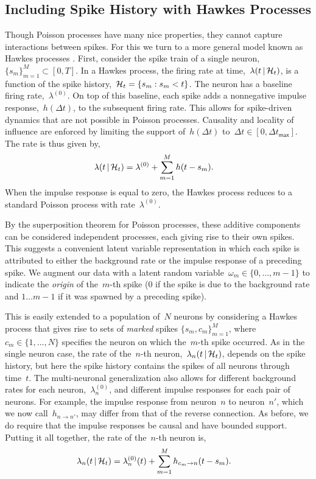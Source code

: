 \subsection{Including Spike History with Hawkes Processes}
Though Poisson processes have many nice properties, they cannot
capture interactions between spikes. For this we turn to a more
general model known as Hawkes processes \citep{Hawkes-1971}. 
First, consider the spike train of a single neuron,~$\{s_m\}_{m=1}^M \subset [0,T]$.
In a Hawkes process, the firing rate at time,~$\lambda(t \,|\, \mathcal{H}_t)$, is a function of 
the spike history,~${\mathcal{H}_t = \{s_m: s_m < t\}}$.  The neuron has a 
baseline firing rate,~$\lambda^{(0)}$. On top of this baseline, 
each spike 
adds a nonnegative impulse response,~$h(\Delta t)$, to the 
subsequent firing rate.  This allows for spike-driven dynamics that are not possible in Poisson
processes.  Causality and
locality of influence are enforced by limiting the support of~$h(\Delta
t)$ to~${\Delta t \in [0,\Delta t_{\mathsf{max}}]}$.
The rate is thus given by,
\begin{align*}
  \lambda(t \,|\, \mathcal{H}_t)
  &= \lambda^{(0)} + \sum_{m=1}^M h(t - s_m).
\end{align*}
When the impulse response is equal to zero, the Hawkes process
reduces to a standard Poisson process with rate~$\lambda^{(0)}$.

By the superposition theorem for Poisson processes, these additive
components can be considered independent processes, each giving rise
to their own spikes.  This suggests a convenient latent variable
representation in which each spike is attributed to either the
background rate or the impulse response of a preceding spike.  We
augment our data with a latent random
variable~${\omega_m \in\{0,\ldots, m-1\}}$ to indicate the \emph{origin} of
the~$m$-th spike ($0$ if the spike is due to the background rate and
${1\ldots m-1}$ if it was spawned by a preceding spike). 

This is easily extended to a population of~$N$ neurons by considering a Hawkes
process that gives rise to sets of
\emph{marked} spikes $\{s_m,c_m\}_{m=1}^M$,
where~${c_m\in\{1,\ldots,N\}}$ specifies the neuron on which
the~$m$-th spike occurred.  As in the single neuron case, 
the rate of the~$n$-th neuron,~${\lambda_n(t\,|\,
  \mathcal{H}_t)}$,  depends on the spike history, but here the spike history 
contains the spikes of all neurons through time~$t$. 
The multi-neuronal generalization also allows for different background rates 
for each neuron,~$\lambda^{(0)}_{n}$, and  different impulse 
responses for each pair of neurons. For example, the impulse 
response from neuron~$n$ to neuron~$n'$, which we now call~$h_{n \to n'}$, 
may differ from that of the reverse connection. As before, we
do require that the impulse responses be causal and have bounded support.
Putting it all together, the rate of the~$n$-th neuron is,
\begin{align}
  \label{eq:hawkes_rate}
  \lambda_n(t \,|\, \mathcal{H}_t)
  &= \lambda^{(0)}_{n}(t) + \sum_{m=1}^M h_{c_m \to n}(t - s_m).
\end{align}

